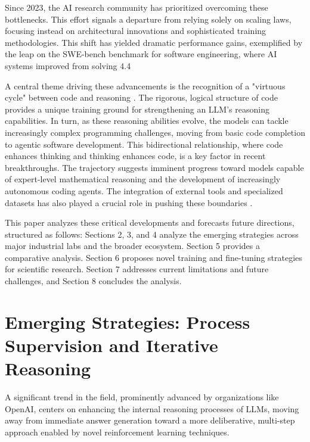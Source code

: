 \documentclass{article}
\begin{document}
Since 2023, the AI research community has prioritized overcoming these bottlenecks. This effort signals a departure from relying solely on scaling laws, focusing instead on architectural innovations and sophisticated training methodologies. This shift has yielded dramatic performance gains, exemplified by the leap on the SWE-bench benchmark for software engineering, where AI systems improved from solving 4.4%

A central theme driving these advancements is the recognition of a "virtuous cycle" between code and reasoning \cite{yang2025code}. The rigorous, logical structure of code provides a unique training ground for strengthening an LLM's reasoning capabilities. In turn, as these reasoning abilities evolve, the models can tackle increasingly complex programming challenges, moving from basic code completion to agentic software development. This bidirectional relationship, where code enhances thinking and thinking enhances code, is a key factor in recent breakthroughs. The trajectory suggests imminent progress toward models capable of expert-level mathematical reasoning and the development of increasingly autonomous coding agents. The integration of external tools and specialized datasets has also played a crucial role in pushing these boundaries \cite{schick2023toolformer, gao2023retrieval}.

This paper analyzes these critical developments and forecasts future directions, structured as follows: Sections 2, 3, and 4 analyze the emerging strategies across major industrial labs and the broader ecosystem. Section 5 provides a comparative analysis. Section 6 proposes novel training and fine-tuning strategies for scientific research. Section 7 addresses current limitations and future challenges, and Section 8 concludes the analysis.

\section{Emerging Strategies: Process Supervision and Iterative Reasoning}
A significant trend in the field, prominently advanced by organizations like OpenAI, centers on enhancing the internal reasoning processes of LLMs, moving away from immediate answer generation toward a more deliberative, multi-step approach enabled by novel reinforcement learning techniques.
\end{document}
